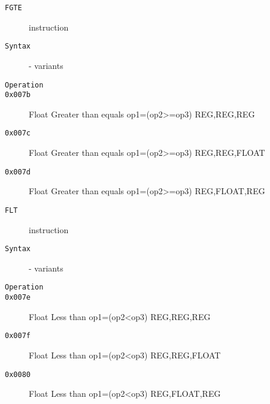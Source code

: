 \begin{description}
\item[\texttt{FGTE}] instruction\\
\item[\texttt{Syntax}] - variants\\

\item[\texttt{Operation}]
\item[\texttt{}]
\item[\texttt{0x007b}] Float Greater than equals op1=(op2>=op3)  {REG,REG,REG}       \\
\item[\texttt{0x007c}] Float Greater than equals op1=(op2>=op3)  {REG,REG,FLOAT}     \\
\item[\texttt{0x007d}] Float Greater than equals op1=(op2>=op3)  {REG,FLOAT,REG}     \\
\end{description}
\clearpage
\begin{description}
\item[\texttt{FLT}] instruction\\
\item[\texttt{Syntax}] - variants\\

\item[\texttt{Operation}]
\item[\texttt{}]
\item[\texttt{0x007e}] Float Less than op1=(op2<op3)  {REG,REG,REG}       \\
\item[\texttt{0x007f}] Float Less than op1=(op2<op3)  {REG,REG,FLOAT}     \\
\item[\texttt{0x0080}] Float Less than op1=(op2<op3)  {REG,FLOAT,REG}     \\
\end{description}
